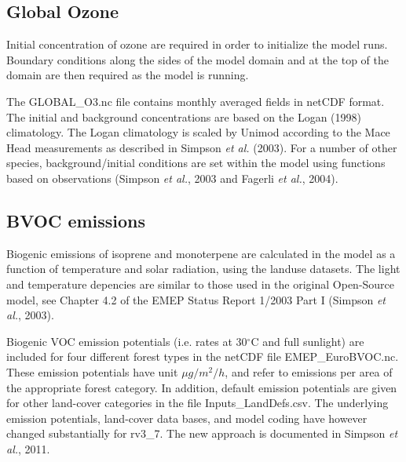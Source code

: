 \subsection{Global Ozone}

Initial concentration of ozone are required in order to
initialize the model runs. Boundary conditions along the sides of the model
domain and at the top of the domain are then required as the model is
running.

The GLOBAL\_O3.nc file contains monthly averaged fields in netCDF format. 
The initial and background
concentrations are based on the Logan (1998) climatology. The Logan
climatology is scaled by Unimod according to the Mace Head measurements as
described in Simpson {\sl et al.} (2003). For a number of other species, 
background/initial conditions are set within the model using functions 
based on observations (Simpson {\sl et al.}, 2003 and Fagerli {\sl et al.}, 2004).



\subsection{BVOC emissions}

Biogenic emissions of isoprene and monoterpene are calculated in the
model as a function of temperature and solar radiation, using the landuse
datasets. The light and temperature depencies are similar to those
used in the original Open-Source model, see 
Chapter 4.2 of the EMEP Status Report 1/2003 Part I (Simpson
{\sl et al.}, 2003).

Biogenic VOC emission potentials (i.e. rates at 30$^\circ$C and full sunlight)
are included for four different forest types in the netCDF file 
EMEP\_EuroBVOC.nc. These emission potentials have unit $\mu g/m^{2} /h$, and
refer to emissions per area of the appropriate forest category. In 
addition, default emission potentials are given for other
land-cover categories in the file Inputs\_LandDefs.csv. 
The underlying emission potentials, land-cover data bases, and model
coding have however changed substantially for rv3\_7. The new approach
is documented in Simpson {\sl et al.}, 2011.







